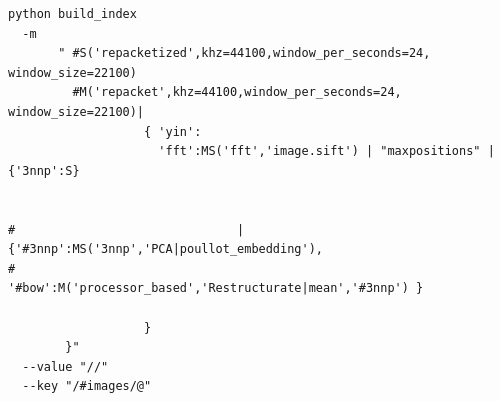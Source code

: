\documentclass{report}
\begin{document}
\begin{lstlisting}
python build_index
  -m   
       " #S('repacketized',khz=44100,window_per_seconds=24, window_size=22100)
         #M('repacket',khz=44100,window_per_seconds=24, window_size=22100)|
                   { 'yin':
                     'fft':MS('fft','image.sift') | "maxpositions" | {'3nnp':S}


#                               |{'#3nnp':MS('3nnp','PCA|poullot_embedding'),
#                                 '#bow':M('processor_based','Restructurate|mean','#3nnp') }
  
                   }
        }"
  --value "//"
  --key "/#images/@"

\end{lstlisting}
\end{document}
